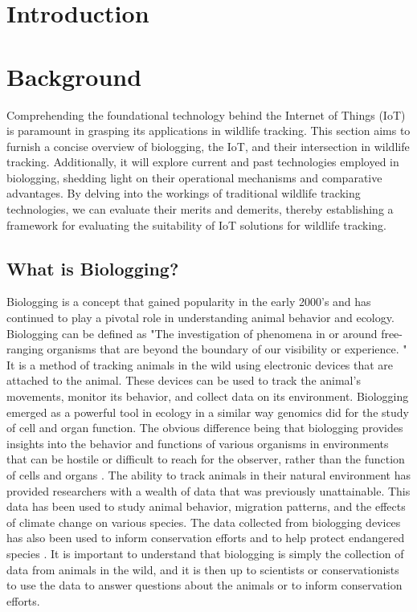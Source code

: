 \documentclass[sigplan,screen,nonacm]{acmart}
\begin{document}
\section{Introduction}
\label{sec:introduction}

\section{Background}
\label{sec:Background}

Comprehending the foundational technology behind the Internet of Things (IoT)
is paramount in grasping its applications in wildlife tracking. This section
aims to furnish a concise overview of biologging, the IoT, and their
intersection in wildlife tracking. Additionally, it will explore current and past
technologies employed in biologging, shedding light on their operational
mechanisms and comparative advantages. By delving into the workings of
traditional wildlife tracking technologies, we can evaluate their merits and
demerits, thereby establishing a framework for evaluating the suitability of
IoT solutions for wildlife tracking.

\subsection{What is Biologging?}
\label{subsec:What is Biologging}

Biologging is a concept that gained popularity in the early 2000's and has continued
to play a pivotal role in understanding animal behavior and ecology. Biologging can be
defined as "The investigation of phenomena in or around free-ranging organisms that are beyond
the boundary of our visibility or experience. \cite{boyd2004bio}"
It is a method of tracking animals in the wild using electronic devices that are
attached to the animal. These devices can be used to track the animal's
movements, monitor its behavior, and collect data on its environment. Biologging
emerged as a powerful tool in ecology in a similar way genomics did for the study
of cell and organ function. The obvious difference being that biologging provides
insights into the behavior and functions of various organisms in environments that
can be hostile or difficult to reach for the observer, rather than the function of cells and
organs \cite{boyd2004bio}. The ability to track animals in their natural environment has
provided researchers with a wealth of data that was previously unattainable. This data
has been used to study animal behavior, migration patterns, and the effects of climate change
on various species\cite{10.3389/fevo.2018.00092}. The data collected from biologging
devices has also been used to inform conservation efforts and to help protect endangered
species \cite{cooke2008biotelemetry}. It is important to understand that biologging is
simply the collection of data from animals in the wild, and it is then up to scientists
or conservationists to use the data to answer questions about the animals or to inform
conservation efforts.
\end{document}
